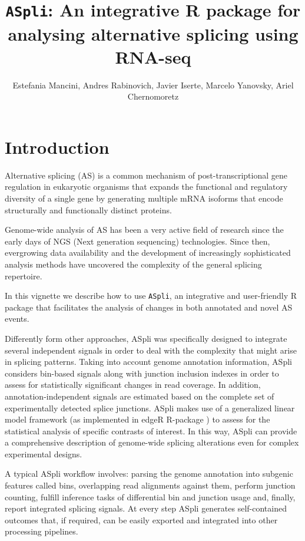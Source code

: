 \documentclass{article}
\title{\texttt{ASpli}: An integrative R package for analysing alternative splicing using RNA-seq}
\author{Estefania Mancini, Andres Rabinovich, Javier Iserte, Marcelo Yanovsky, Ariel Chernomoretz}
\begin{document}


\maketitle

\tableofcontents

\section{Introduction}
Alternative splicing (AS) is a common mechanism of post-transcriptional gene 
regulation in eukaryotic organisms that expands the functional and regulatory 
diversity of a single gene by generating multiple mRNA isoforms that encode 
structurally and functionally distinct proteins. 

Genome-wide analysis of AS has been a very active field of research since 
the early days of NGS (Next generation sequencing) technologies.  Since then, evergrowing data availability and the development of increasingly sophisticated analysis methods have uncovered 
the complexity of the general splicing repertoire.  

In this vignette we describe how to use \texttt{ASpli}, an integrative and user-friendly
R package that facilitates the analysis of changes in both annotated and novel 
AS events. 

Differently form other approaches, ASpli was specifically designed to integrate several independent signals in order to deal with the complexity that might arise in splicing patterns. Taking into account genome annotation information, ASpli considers bin-based signals along  with junction inclusion indexes in order to assess for statistically significant changes in read coverage. In addition, annotation-independent signals are estimated based on the complete set of experimentally detected splice junctions.  ASpli makes use of a generalized linear model framework (as implemented in edgeR R-package \cite{Robinson2010}) to assess for the statistical  analysis of specific contrasts of interest. In this way, ASpli can provide a comprehensive description of genome-wide splicing alterations even for complex experimental designs. 

A typical ASpli workflow  involves: parsing the genome annotation into subgenic features called bins, overlapping read alignments against them, perform junction counting, fulfill inference tasks of differential bin and junction usage and, finally, report integrated splicing signals. At every step ASpli generates self-contained outcomes that, if required, can be easily exported and integrated into other processing pipelines. 
\end{document}
